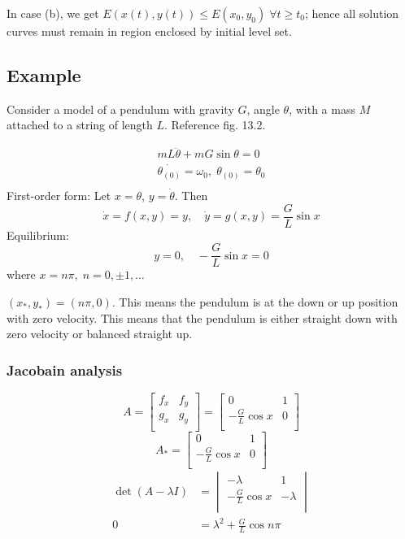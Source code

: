 \documentclass[12pt]{article}
\begin{document}
In case (b), we get $E(x(t),y(t))\le E(x_0,y_0)\;\forall t\ge t_0$; hence all
solution curves must remain in region enclosed by initial level set.

\subsection{Example}
Consider a model of a pendulum with gravity $G$, angle $\theta$, with a mass $M$
attached to a string of length $L$. Reference fig. 13.2.

\begin{equation*}
  \begin{aligned}
    mL\ddot{\theta}+mG\sin\theta=0 \\
    \dot{\theta_{(0)}}=\omega_0,\;\theta_{(0)}=\theta_0 \\
  \end{aligned}
\end{equation*}
First-order form: Let $x=\theta$, $y=\dot{\theta}$. Then
$$\dot{x}=f(x,y)=y,\quad \dot{y}=g(x,y)=\frac{G}{L}\sin x$$
Equilibrium:
$$y=0,\quad -\frac{G}{L}\sin x=0$$ where $x=n\pi,\;n=0,\pm1,\ldots$

$(x_*,y_*)=(n\pi,0)$. This means the pendulum is at the down or up position with
zero velocity. This means that the pendulum is either straight down with zero
velocity or balanced straight up.

\subsubsection*{Jacobain analysis}
\begin{equation*}
A =
\begin{bmatrix}
  f_x & f_y \\ g_x & g_y \\
\end{bmatrix} =
\begin{bmatrix}
  0 & 1 \\ -\frac{G}{L}\cos x & 0 \\
\end{bmatrix}
\end{equation*}
\begin{equation*}
  A_* =
  \begin{bmatrix}
    0 & 1 \\ -\frac{G}{L}\cos x & 0 \\
  \end{bmatrix}
\end{equation*}
\begin{equation*}
  \begin{aligned}
    \det (A - \lambda I) &=
    \begin{vmatrix}
      -\lambda & 1 \\ -\frac{G}{L}\cos x & -\lambda \\
    \end{vmatrix} \\
    0 &= \lambda^2 + \frac{G}{L}\cos{n\pi}
  \end{aligned}
\end{equation*}
\end{document}
